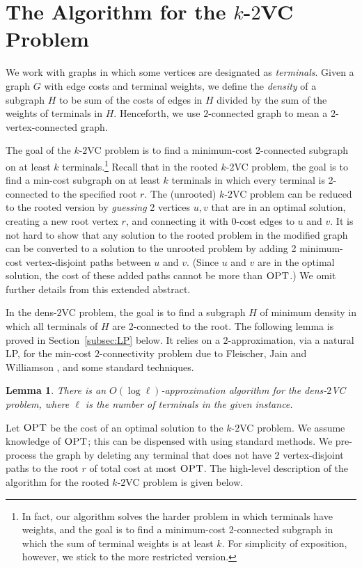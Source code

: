 \documentclass[11pt]{article}
\newtheorem{lemma}{Lemma}[section]
\newcommand{\kvc}[1]{$k$-$#1${\sc VC} }
\newcommand{\kv}{\kvc{2}}
\newcommand{\densV}{dens-$2${\sc VC} }
\newcommand{\opt}{\textrm{\sc OPT}}
\begin{document}
\section{The Algorithm for the \kv Problem}\label{sec:k2vc}

We work with graphs in which some vertices are designated as
\emph{terminals}.  Given a graph $G$ with edge costs and terminal
weights, we define the \emph{density} of a subgraph $H$ to be sum of
the costs of edges in $H$ divided by the sum of the weights of
terminals in $H$.  Henceforth, we use $2$-connected graph to mean a
$2$-vertex-connected graph.

The goal of the \kv problem is to find a minimum-cost 2-connected
subgraph on at least $k$ terminals.\footnote{In fact, our algorithm
  solves the harder problem in which terminals have weights, and the
  goal is to find a minimum-cost 2-connected subgraph in which the sum
  of terminal weights is at least $k$. For simplicity of exposition,
  however, we stick to the more restricted version.}  Recall that in
the rooted \kv problem, the goal is to find a min-cost subgraph on at
least $k$ terminals in which every terminal is 2-connected to the
specified root $r$. The (unrooted) \kv problem can be reduced to the
rooted version by \emph{guessing} 2 vertices $u,v$ that are in an
optimal solution, creating a new root vertex $r$, and connecting it
with 0-cost edges to $u$ and $v$. It is not hard to show that any
solution to the rooted problem in the modified graph can be converted
to a solution to the unrooted problem by adding 2 minimum-cost
vertex-disjoint paths between $u$ and $v$.  (Since $u$ and $v$ are in
the optimal solution, the cost of these added paths cannot be more
than $\opt$.) We omit further details from this extended abstract.

In the \densV problem, the goal is to find a subgraph $H$ of minimum
density in which all terminals of $H$ are 2-connected to the root. The
following lemma is proved in Section~\ref{subsec:LP} below.  It relies
on a $2$-approximation, via a natural LP, for the min-cost
$2$-connectivity problem due to Fleischer, Jain and Williamson
\cite{FleischerJW}, and some standard techniques.

\begin{lemma}\label{lem:densV}
  There is an $O(\log \ell)$-approximation algorithm for the \densV
  problem, where $\ell$ is the number of terminals in the given
  instance.
\end{lemma}

Let $\opt$ be the cost of an optimal solution to the \kv problem. We
assume knowledge of $\opt$; this can be dispensed with using standard
methods.  We pre-process the graph by deleting any terminal that does
not have 2 vertex-disjoint paths to the root $r$ of total cost at most
$\opt$. The high-level description of the algorithm for the 
rooted \kv problem is given below.
\end{document}
